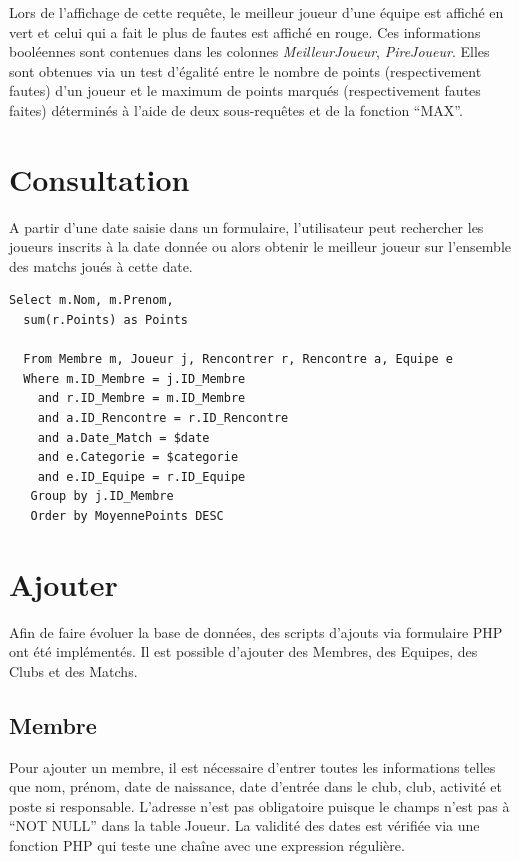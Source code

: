 \documentclass[a4paper»,8pt,french,fleqn]{report}
\begin{document}
Lors de l'affichage de cette requête, le meilleur joueur d'une équipe est affiché en vert et celui qui a fait le plus de fautes est affiché en rouge. Ces informations booléennes sont contenues dans les colonnes \textit{MeilleurJoueur}, \textit{PireJoueur}. Elles sont obtenues via un test d'égalité entre le nombre de points (respectivement fautes) d'un joueur et le maximum de points marqués (respectivement fautes faites) déterminés à l'aide de deux sous-requêtes et de la fonction ``MAX''.


\section{Consultation}
A partir d'une date saisie dans un formulaire, l'utilisateur peut rechercher les joueurs inscrits à la date donnée ou alors obtenir le meilleur joueur sur l'ensemble des matchs joués à cette date.\\

\begin{lstlisting}
Select m.Nom, m.Prenom,
  sum(r.Points) as Points
				
  From Membre m, Joueur j, Rencontrer r, Rencontre a, Equipe e
  Where m.ID_Membre = j.ID_Membre
    and r.ID_Membre = m.ID_Membre
    and a.ID_Rencontre = r.ID_Rencontre
    and a.Date_Match = $date
    and e.Categorie = $categorie
    and e.ID_Equipe = r.ID_Equipe
   Group by j.ID_Membre
   Order by MoyennePoints DESC
\end{lstlisting}

\section{Ajouter}

Afin de faire évoluer la base de données, des scripts d'ajouts via formulaire PHP ont été implémentés. Il est possible d'ajouter des Membres, des Equipes, des Clubs et des Matchs.

\subsection{Membre}
Pour ajouter un membre, il est nécessaire d'entrer toutes les informations telles que nom, prénom, date de naissance, date d'entrée dans le club, club, activité et poste si responsable. L'adresse n'est pas obligatoire puisque le champs n'est pas à ``NOT NULL'' dans la table Joueur. La validité des dates est vérifiée via une fonction PHP qui teste une chaîne avec une expression régulière. \\
\end{document}
